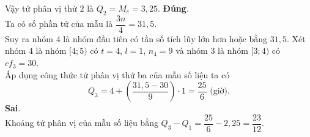 \begin{ex}
{\begin{itemchoice}
Vậy tứ phân vị thứ $2$ là $Q_2=M_e=3{,}25$.
\itemch \textbf{Đúng}.\\
Ta có số phần tử của mẫu là $\dfrac{3n}{4}=31{,}5$.\\
Suy ra nhóm $4$ là nhóm đầu tiên có tần số tích lũy lớn hơn hoặc bằng
$31{,}5$.
Xét nhóm $4$ là nhóm $[4;5)$ có $t=4$, $l=1$, $n_4=9$ và nhóm $3$ là nhóm $[3;4)$ có $cf_3=30$.\\
Áp dụng công thức tứ phân vị thứ ba của mẫu số liệu ta có \[Q_3=4+\left(\dfrac{31{,}5-30}{9}\right)\cdot 1=\dfrac{25}{6}\,\,\text{(giờ)}.\]
\itemch \textbf{Sai}.\\
Khoảng tứ phân vị của mẫu số liệu bằng $Q_3-Q_1=\dfrac{25}{6}-2{,}25=\dfrac{23}{12}$.
\end{itemchoice}
}
\end{ex}

